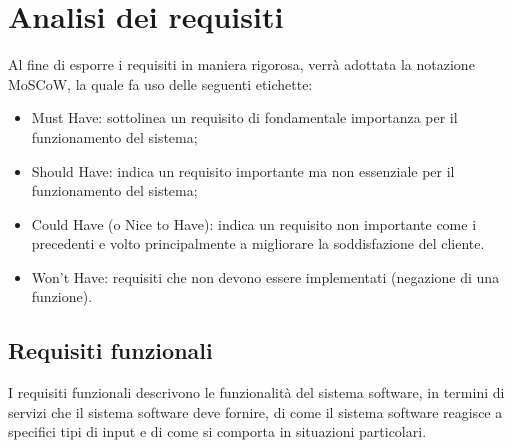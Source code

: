 
\section{Analisi dei requisiti}

Al fine di esporre i requisiti in maniera rigorosa, verrà adottata la notazione MoSCoW, la quale fa uso delle seguenti etichette:
\begin{itemize}
\item Must Have: sottolinea un requisito di fondamentale importanza per il funzionamento del sistema;
\item Should Have: indica un requisito importante ma non essenziale per il funzionamento del sistema;
\item Could Have (o Nice to Have): indica un requisito non importante come i precedenti e volto principalmente a migliorare la soddisfazione del cliente.
\item Won’t Have: requisiti che non devono essere implementati (negazione di una funzione).
\end{itemize}


\newpage

\subsection{Requisiti funzionali}
I requisiti funzionali descrivono le funzionalità del sistema software, in termini di servizi che il sistema software deve fornire, di come il sistema software reagisce a specifici tipi di input e di come si comporta in situazioni particolari.

